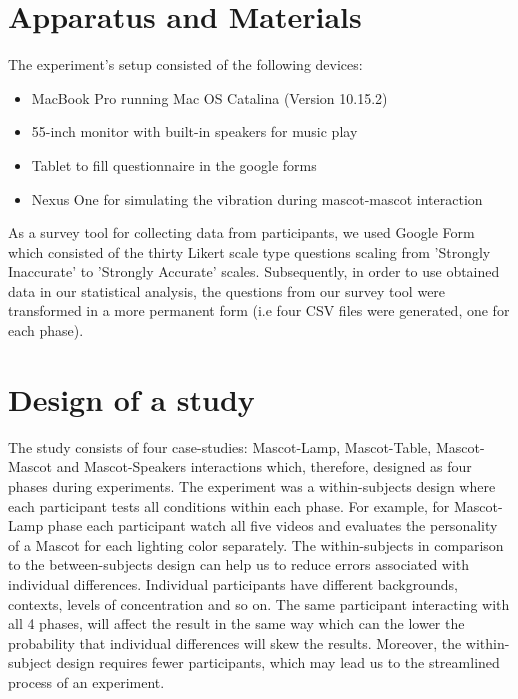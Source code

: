 \section{Apparatus and Materials}
\label{sec:apparatus-and-materials}
The experiment’s setup consisted of the following devices:
\begin{itemize}
  \item MacBook Pro running Mac OS Catalina (Version 10.15.2)
  \item 55-inch monitor with built-in speakers for music play
  \item Tablet to fill questionnaire in the google forms
  \item Nexus One for simulating the vibration during mascot-mascot interaction
\end{itemize}

As a survey tool for collecting data from participants, we used Google Form which consisted
of the thirty Likert scale type questions scaling from 'Strongly Inaccurate' to 'Strongly Accurate' scales.
Subsequently, in order to use obtained data in our statistical analysis, the questions
from our survey tool were transformed in a more permanent form (i.e four CSV files were generated, one for each phase).

\section{Design of a study}
\label{sec:design-of-a-study}
The study consists of four case-studies: Mascot-Lamp, Mascot-Table, Mascot-Mascot and Mascot-Speakers
interactions which, therefore, designed as four phases during experiments.
The experiment was a within-subjects design where each participant tests all conditions within each phase.
For example, for Mascot-Lamp phase each participant watch all five videos and
evaluates the personality of a Mascot for each lighting color separately.
The within-subjects in comparison to the between-subjects design can help us to
reduce errors associated with individual differences.
Individual participants have different backgrounds, contexts, levels of concentration and so on.
The same participant interacting with all 4 phases, will affect the result in the same way
which can the lower the probability that individual differences will skew the results.
Moreover, the within-subject design requires fewer participants, which may lead
us to the streamlined process of an experiment.

